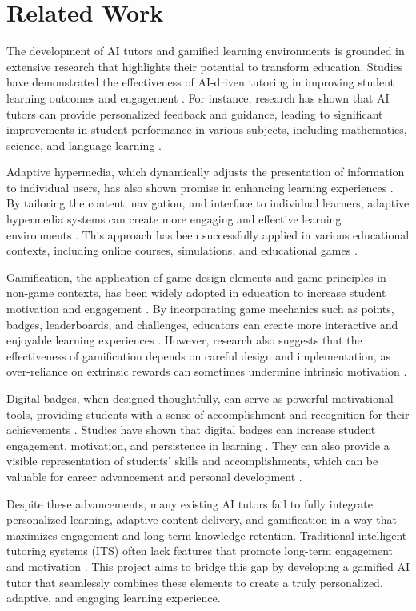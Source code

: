 \documentclass[
	letterpaper, %
]{jdf}
\begin{document}
\section{Related Work}

The development of AI tutors and gamified learning environments is grounded in extensive research that highlights their potential to transform education. Studies have demonstrated the effectiveness of AI-driven tutoring in improving student learning outcomes and engagement \cite{beck1996}. For instance, research has shown that AI tutors can provide personalized feedback and guidance, leading to significant improvements in student performance in various subjects, including mathematics, science, and language learning \cite{vanlehn2011}.

Adaptive hypermedia, which dynamically adjusts the presentation of information to individual users, has also shown promise in enhancing learning experiences \cite{brusilovsky2001}. By tailoring the content, navigation, and interface to individual learners, adaptive hypermedia systems can create more engaging and effective learning environments \cite{brusilovsky2001}. This approach has been successfully applied in various educational contexts, including online courses, simulations, and educational games \cite{brusilovsky2001}.

Gamification, the application of game-design elements and game principles in non-game contexts, has been widely adopted in education to increase student motivation and engagement \cite{gee2003,kapp2012}. By incorporating game mechanics such as points, badges, leaderboards, and challenges, educators can create more interactive and enjoyable learning experiences \cite{kapp2012}. However, research also suggests that the effectiveness of gamification depends on careful design and implementation, as over-reliance on extrinsic rewards can sometimes undermine intrinsic motivation \cite{ryan2000}.

Digital badges, when designed thoughtfully, can serve as powerful motivational tools, providing students with a sense of accomplishment and recognition for their achievements \cite{gibson2015}. Studies have shown that digital badges can increase student engagement, motivation, and persistence in learning \cite{gibson2015}. They can also provide a visible representation of students' skills and accomplishments, which can be valuable for career advancement and personal development \cite{gibson2015}.

Despite these advancements, many existing AI tutors fail to fully integrate personalized learning, adaptive content delivery, and gamification in a way that maximizes engagement and long-term knowledge retention. Traditional intelligent tutoring systems (ITS) often lack features that promote long-term engagement and motivation \cite{dominguez2013}. This project aims to bridge this gap by developing a gamified AI tutor that seamlessly combines these elements to create a truly personalized, adaptive, and engaging learning experience.
\end{document}
